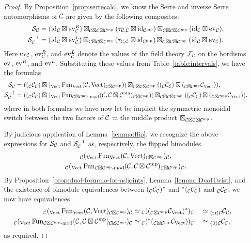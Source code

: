 \documentclass{amsart}
\begin{document}
\begin{proof}
By Proposition~\ref{prop:serrecalc}, we know the Serre and inverse Serre automorphisms of $\mathcal C$ are given by the following composites:
\begin{align*}
\mathcal S_\mathcal C &= (\mathrm{id}_\mathcal C \boxtimes \mathrm{ev}_\mathcal C^R) \boxtimes_{\mathcal C \boxtimes \mathcal C \boxtimes \mathcal C^{\mathrm{mp}}} (\tau_{\mathcal C,\mathcal C} \boxtimes \mathrm{id}_{\mathcal C^{\mathrm{mp}}}) \boxtimes_{\mathcal C \boxtimes \mathcal C \boxtimes \mathcal C^{\mathrm{mp}}} (\mathrm{id}_\mathcal C \boxtimes \mathrm{ev}_\mathcal C), \\
\mathcal S^{-1}_\mathcal C &= (\mathrm{id}_\mathcal C \boxtimes \mathrm{ev}_\mathcal C^L) \boxtimes_{\mathcal C \boxtimes \mathcal C \boxtimes \mathcal C^{\mathrm{mp}}} (\tau_{\mathcal C,\mathcal C} \boxtimes \mathrm{id}_{\mathcal C^{\mathrm{mp}}}) \boxtimes_{\mathcal C \boxtimes \mathcal C \boxtimes \mathcal C^{\mathrm{mp}}} (\mathrm{id}_\mathcal C \boxtimes \mathrm{ev}_\mathcal C).
\end{align*}
Here $\mathrm{ev}_\mathcal C$, $\mathrm{ev}^R_\mathcal C$, and $\mathrm{ev}^L_\mathcal C$ denote the values of the field theory $\mathcal F_\mathcal C$ on the bordisms $\mathrm{ev}$, $\mathrm{ev}^R$, and $\mathrm{ev}^L$.  Substituting these values from Table~\ref{table:intervals}, we have the formulas
\begin{align*}
\cS_\cC &= (({}_\cC \cC_\cC) \boxtimes ({}_\Vect \Fun_\Vect(\cC,\Vect)_{\cC \boxtimes \cC^\mp})) \boxtimes_{\cC \boxtimes \cC \boxtimes \cC^\mp} (({}_\cC \cC_\cC) \boxtimes ({}_{\cC \boxtimes \cC^\mp} \cC_\Vect)), \\
\cS^{-1}_\cC &= (({}_\cC \cC_\cC) \boxtimes ({}_\Vect \Fun_{\mod{\cC \boxtimes \cC^\mp}{}}(\cC,\cC \boxtimes \cC^\mp)_{\cC \boxtimes \cC^\mp})) \boxtimes_{\cC \boxtimes \cC \boxtimes \cC^\mp} (({}_\cC \cC_\cC) \boxtimes ({}_{\cC \boxtimes \cC^\mp} \cC_\Vect)),
\end{align*}
where in both formulas we have now let be implicit the symmetric monoidal switch between the two factors of $\mathcal C$ in the middle product $\boxtimes_{\mathcal C \boxtimes \mathcal C \boxtimes \mathcal C^{\mathrm{mp}}}$.

By judicious application of Lemma~\ref{lemma:flip}, we recognize the above expressions for $\mathcal S_\mathcal C$ and $\mathcal S^{-1}_\mathcal C$ as, respectively, the flipped bimodules 
\begin{gather*}
{}_\cC ({}_\Vect \Fun_\Vect(\cC,\Vect)_{\cC \boxtimes \cC^\mp})_\cC, \\
{}_\cC ({}_\Vect \Fun_{\mod{\cC \boxtimes \cC^\mp}{}}(\cC,\cC \boxtimes \cC^\mp)_{\cC \boxtimes \cC^\mp})_\cC.
\end{gather*}
By Proposition~\ref{prop:dual-formula-for-adjoints}, Lemma~\ref{lemma:DualTwist}, and the existence of bimodule equivalences between $({}_\mathcal C \mathcal C_\mathcal C)^*$ and ${}^*({}_\mathcal C \mathcal C_\mathcal C)$ and ${}_\mathcal C \mathcal C_\mathcal C$, we now have equivalences
\begin{alignat*}{3}
{}_\cC ({}_\Vect \Fun_\Vect(\cC,\Vect)_{\cC \boxtimes \cC^\mp})_\cC 
& \simeq  {}_\cC(({}_{\cC \boxtimes \cC^\mp} \cC_{\Vect})^*)_\cC
&& \simeq  \bimod{\langle \mathfrak{r r} \rangle \cC}{\cC}{\cC}, &&\\
{}_\cC ({}_\Vect \Fun_{\mod{\cC \boxtimes \cC^\mp}{}}(\cC,\cC \boxtimes \cC^\mp)_{\cC \boxtimes \cC^\mp})_\cC
& \simeq  {}_\cC ({}^*(\bimod{\cC \boxtimes \cC^\mp}{\cC}{\Vect}))_\cC
&& \simeq  \bimod{\langle \mathfrak{l l} \rangle \cC}{\cC}{\cC}, &&
\end{alignat*}
as required.  
\end{proof}
\end{document}
